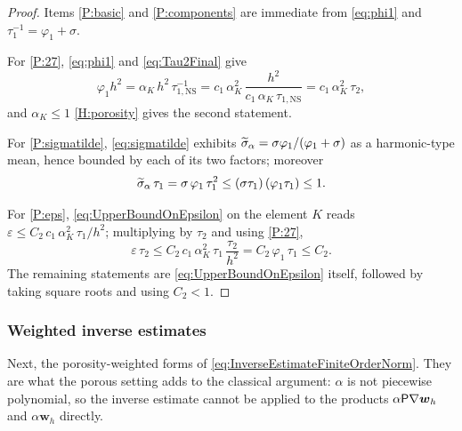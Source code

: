 \begin{proof}
Items \ref{P:basic} and \ref{P:components} are immediate from
\eqref{eq:phi1} and $\tau_1^{-1}=\varphi_1+\sigma$.

For \ref{P:27}, \eqref{eq:phi1} and \cref{eq:Tau2Final} give
\begin{equation*}
  \varphi_1 h^2 = \alpha_K\,h^2\,\tau_{1,\mathrm{NS}}^{-1}
  = c_1\,\alpha_K^2\,\frac{h^2}{c_1\,\alpha_K\,\tau_{1,\mathrm{NS}}}
  = c_1\,\alpha_K^2\,\tau_2 ,
\end{equation*}
and $\alpha_K\le1$ \cref{H:porosity} gives the second statement.

For \ref{P:sigmatilde}, \eqref{eq:sigmatilde} exhibits
$\widetilde{\sigma}_{\alpha}=\sigma\varphi_1/(\varphi_1+\sigma)$ as a harmonic-type mean, hence bounded by
each of its two factors; moreover
\begin{equation*}
  \widetilde{\sigma}_{\alpha}\,\tau_1 = \sigma\,\varphi_1\,\tau_1^2
  \le (\sigma\tau_1)\,(\varphi_1\tau_1)\le 1 .
\end{equation*}

For \ref{P:eps}, \eqref{eq:UpperBoundOnEpsilon} on the element $K$ reads
$\varepsilon\le C_2\,c_1\,\alpha_K^2\,\tau_1/h^2$; multiplying by $\tau_2$ and using
\ref{P:27},
\begin{equation*}
  \varepsilon\,\tau_2 \le C_2\,c_1\,\alpha_K^2\,\tau_1\,\frac{\tau_2}{h^2}
  = C_2\,\varphi_1\,\tau_1 \le C_2 .
\end{equation*}
The remaining statements are \eqref{eq:UpperBoundOnEpsilon} itself, followed by taking square
roots and using $C_2<1$.
\end{proof}

\subsubsection{Weighted inverse estimates}

Next, the porosity{\hyp}weighted forms of \eqref{eq:InverseEstimateFiniteOrderNorm}. They are
what the porous setting adds to the classical argument: $\alpha$ is not piecewise polynomial, so
the inverse estimate cannot be applied to the products $\alpha\mathsf{P}\nabla\boldsymbol{w}_h$
and $\alpha\boldsymbol{w}_h$ directly.

